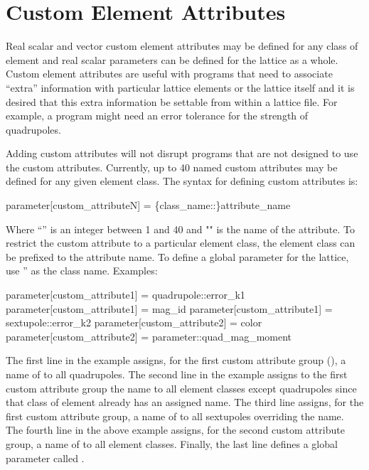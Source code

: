 {{{{{%
\section{Custom Element Attributes}
\label{s:cust.att}

Real scalar and vector custom element attributes may be defined for any class of element and real
scalar parameters can be defined for the lattice as a whole.  Custom element attributes are useful
with programs that need to associate ``extra'' information with particular lattice elements or the
lattice itself and it is desired that this extra information be settable from within a lattice
file. For example, a program might need an error tolerance for the strength of quadrupoles.

Adding custom attributes will not disrupt programs that are not designed to use the custom
attributes. Currently, up to 40 named custom attributes may be defined for any given element
class. The syntax for defining custom attributes is:
\begin{example}
  parameter[custom_attributeN] = \{class_name::\}attribute_name
\end{example}
Where ``'' is an integer between 1 and 40 and "" is the name of the
attribute. To restrict the custom attribute to a particular element class, the element class can be
prefixed to the attribute name. To define a global parameter for the lattice, use ''
as the class name.
Examples:
\begin{example}
  parameter[custom_attribute1] = quadrupole::error_k1
  parameter[custom_attribute1] = mag_id
  parameter[custom_attribute1] = sextupole::error_k2
  parameter[custom_attribute2] = color
  parameter[custom_attribute2] = parameter::quad_mag_moment
\end{example}
The first line in the example assigns, for the first custom attribute group
(), a name of  to all quadrupoles. The second line in the example
assigns to the first custom attribute group the name  to all element classes except
quadrupoles since that class of element already has an assigned name. The third line assigns, for
the first custom attribute group, a name of  to all sextupoles overriding the
 name. The fourth line in the above example assigns, for the second custom attribute
group, a name of  to all element classes. Finally, the last line defines a global parameter
called .

}}}}}

